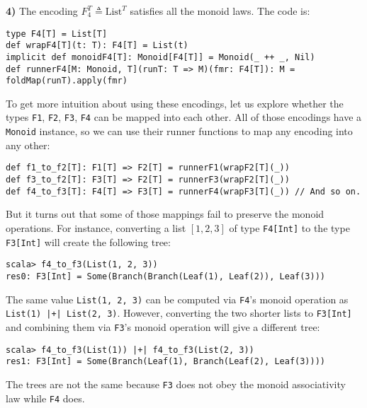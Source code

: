 \textbf{4)} The encoding $F_{4}^{T}\triangleq\text{List}^{T}$ satisfies
all the monoid laws. The code is:
\begin{lstlisting}
type F4[T] = List[T]
def wrapF4[T](t: T): F4[T] = List(t)
implicit def monoidF4[T]: Monoid[F4[T]] = Monoid(_ ++ _, Nil)
def runnerF4[M: Monoid, T](runT: T => M)(fmr: F4[T]): M = foldMap(runT).apply(fmr)
\end{lstlisting}
To get more intuition about using these encodings, let us explore
whether the types \lstinline!F1!,
\lstinline!F2!, \lstinline!F3!,
\lstinline!F4! can be mapped
into each other. All of those encodings have a \lstinline!Monoid!
instance, so we can use their runner functions to map any encoding
into any other:
\begin{lstlisting}
def f1_to_f2[T]: F1[T] => F2[T] = runnerF1(wrapF2[T](_))
def f3_to_f2[T]: F3[T] => F2[T] = runnerF3(wrapF2[T](_))
def f4_to_f3[T]: F4[T] => F3[T] = runnerF4(wrapF3[T](_)) // And so on.
\end{lstlisting}
But it turns out that some of those mappings fail to preserve the
monoid operations. For instance, converting a list $\left[1,2,3\right]$
of type \lstinline!F4[Int]!
to the type \lstinline!F3[Int]!
will create the following tree:
\begin{lstlisting}
scala> f4_to_f3(List(1, 2, 3))
res0: F3[Int] = Some(Branch(Branch(Leaf(1), Leaf(2)), Leaf(3)))
\end{lstlisting}
The same value \lstinline!List(1, 2, 3)!
can be computed via \lstinline!F4!\textsf{'}s
monoid operation as \lstinline!List(1) |+| List(2, 3)!.
However, converting the two shorter lists to \lstinline!F3[Int]!
and combining them via \lstinline!F3!\textsf{'}s
monoid operation will give a different tree:
\begin{lstlisting}
scala> f4_to_f3(List(1)) |+| f4_to_f3(List(2, 3))
res1: F3[Int] = Some(Branch(Leaf(1), Branch(Leaf(2), Leaf(3))))
\end{lstlisting}
The trees are not the same because \lstinline!F3!
does not obey the monoid associativity law while \lstinline!F4!
does.

